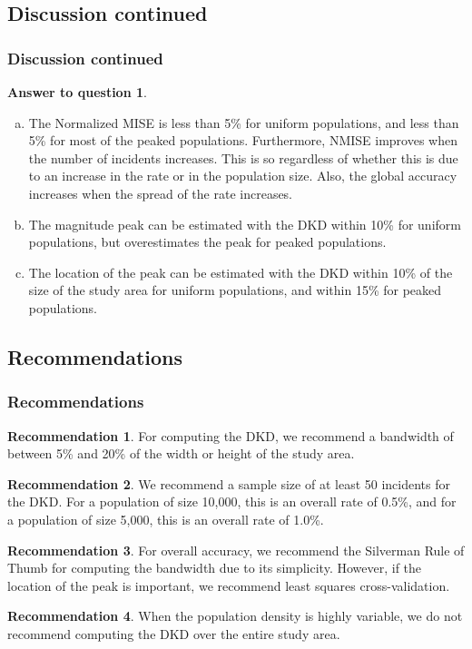 \documentclass[notheorems]{beamer}
\theoremstyle{definition}
\newtheorem{answer}{Answer to question}
\theoremstyle{example}
\newtheorem{recommendation}{Recommendation}
\begin{document}
\subsection{Discussion continued}
\begin{frame}\frametitle{Discussion continued}
    \begin{answer}
        \begin{enumerate}[a)]
            \item
                The Normalized MISE is less than 5\% for uniform populations,
                and less than 5\% for most of the peaked populations.
                Furthermore, NMISE improves when the number of incidents increases.
                This is so regardless of whether this is due to an increase in the rate or in the population size.
                Also, the global accuracy increases when the spread of the rate increases.
            \item
                The magnitude peak can be estimated with the DKD within 10\% for uniform populations,
                but overestimates the peak for peaked populations.
            \item
                The location of the peak can be estimated with the DKD within 10\% of the size of the study area for uniform populations,
                and within 15\% for peaked populations.
        \end{enumerate}
    \end{answer}
\end{frame}

\subsection{Recommendations}
\begin{frame}\frametitle{Recommendations}
    \footnotesize
    \begin{recommendation}
        For computing the DKD,
        we recommend a bandwidth of between 5\% and 20\% of the width or height of the study area.
    \end{recommendation}
    \begin{recommendation}
        We recommend a sample size of at least 50 incidents for the DKD.
        For a population of size 10,000, this is an overall rate of 0.5\%,
        and for a population of size 5,000, this is an overall rate of 1.0\%.
    \end{recommendation}
    \begin{recommendation}
        For overall accuracy,
        we recommend the Silverman Rule of Thumb for computing the bandwidth due to its simplicity.
        However, if the location of the peak is important, we recommend least squares cross-validation.
    \end{recommendation}
    \begin{recommendation}
        When the population density is highly variable,
        we do not recommend computing the DKD over the entire study area.
    \end{recommendation}
\end{frame}
\end{document}
